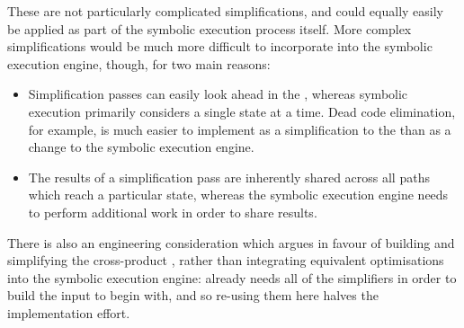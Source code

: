 These are not particularly complicated simplifications, and could
equally easily be applied as part of the symbolic execution process
itself.  More complex simplifications would be much more difficult to
incorporate into the symbolic execution engine, though, for two main
reasons:

\begin{itemize}
\item Simplification passes can easily look ahead in the
  {\StateMachine}, whereas symbolic execution primarily considers a
  single state at a time.  Dead code elimination, for example, is much
  easier to implement as a simplification to the {\StateMachine} than
  as a change to the symbolic execution engine.
\item The results of a simplification pass are inherently shared
  across all paths which reach a particular state, whereas the
  symbolic execution engine needs to perform additional work in order
  to share results.
\end{itemize}

There is also an engineering consideration which argues in favour of
building and simplifying the cross-product {\StateMachine}, rather
than integrating equivalent optimisations into the symbolic execution
engine: {\technique} already needs all of the simplifiers in order to
build the input {\StateMachines} to begin with, and so re-using them
here halves the implementation effort.

